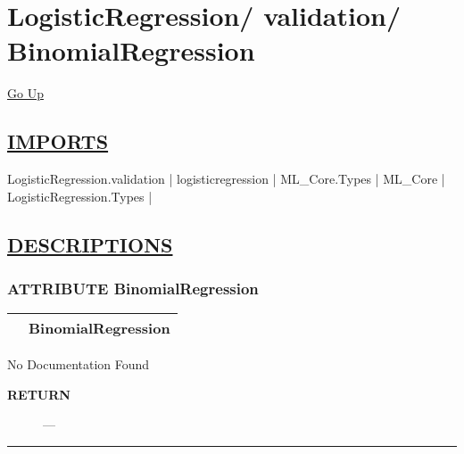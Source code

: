 \chapter*{\color{headfile}
{\large LogisticRegression\slash\hspace{0pt}}
{\large validation\slash\hspace{0pt}}
 \\
BinomialRegression
}
\hypertarget{ecldoc:toc:LogisticRegression.validation.BinomialRegression}{}
\hyperlink{ecldoc:toc:root/LogisticRegression/validation}{Go Up}

\section*{\underline{\textsf{IMPORTS}}}
\begin{doublespace}
{\large
LogisticRegression.validation |
logisticregression |
ML\_Core.Types |
ML\_Core |
LogisticRegression.Types |
}
\end{doublespace}

\section*{\underline{\textsf{DESCRIPTIONS}}}
\subsection*{\textsf{\colorbox{headtoc}{\color{white} ATTRIBUTE}
BinomialRegression}}

\hypertarget{ecldoc:logisticregression.validation.binomialregression}{}

{\renewcommand{\arraystretch}{1.5}
\begin{tabularx}{\textwidth}{|>{\raggedright\arraybackslash}l|X|}
\hline
\hspace{0pt}\mytexttt{\color{red} } & \textbf{BinomialRegression} \\
\hline
\end{tabularx}
}

\par





No Documentation Found








\par
\begin{description}
\item [\colorbox{tagtype}{\color{white} \textbf{\textsf{RETURN}}}] \textbf{} --- 
\end{description}




\rule{\linewidth}{0.5pt}
